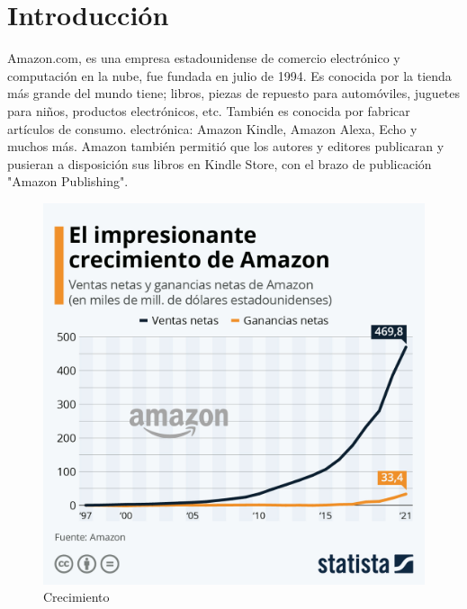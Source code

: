 %
%

\section{Introducción}

Amazon.com,  es una empresa estadounidense de comercio electrónico y computación en la nube, fue fundada en julio de 1994. Es conocida por la tienda más grande del mundo tiene; libros, piezas de repuesto para automóviles, juguetes para niños, productos electrónicos, etc. También es conocida por fabricar artículos de consumo. electrónica: Amazon Kindle, Amazon Alexa, Echo y muchos más. Amazon también permitió que los autores y editores publicaran y pusieran a disposición sus libros en Kindle Store, con el brazo de publicación "Amazon Publishing". 

\begin{figure}[h]
	\centering
	\includegraphics[scale=.2] {img/crecimiento_amazon}
	\caption{Crecimiento}
	\label{fig:1}	
\end{figure}

